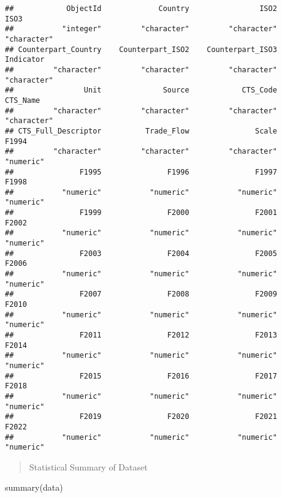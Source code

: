 \documentclass[
]{article}
\newenvironment{Shaded}{\begin{snugshade}}{\end{snugshade}}
\newcommand{\FunctionTok}[1]{\textcolor[rgb]{0.00,0.00,0.00}{#1}}
\newcommand{\NormalTok}[1]{#1}
\begin{document}
\begin{verbatim}
##            ObjectId             Country                ISO2                ISO3 
##           "integer"         "character"         "character"         "character" 
## Counterpart_Country    Counterpart_ISO2    Counterpart_ISO3           Indicator 
##         "character"         "character"         "character"         "character" 
##                Unit              Source            CTS_Code            CTS_Name 
##         "character"         "character"         "character"         "character" 
## CTS_Full_Descriptor          Trade_Flow               Scale               F1994 
##         "character"         "character"         "character"           "numeric" 
##               F1995               F1996               F1997               F1998 
##           "numeric"           "numeric"           "numeric"           "numeric" 
##               F1999               F2000               F2001               F2002 
##           "numeric"           "numeric"           "numeric"           "numeric" 
##               F2003               F2004               F2005               F2006 
##           "numeric"           "numeric"           "numeric"           "numeric" 
##               F2007               F2008               F2009               F2010 
##           "numeric"           "numeric"           "numeric"           "numeric" 
##               F2011               F2012               F2013               F2014 
##           "numeric"           "numeric"           "numeric"           "numeric" 
##               F2015               F2016               F2017               F2018 
##           "numeric"           "numeric"           "numeric"           "numeric" 
##               F2019               F2020               F2021               F2022 
##           "numeric"           "numeric"           "numeric"           "numeric"
\end{verbatim}

\begin{quote}
Statistical Summary of Dataset
\end{quote}

\begin{Shaded}
\begin{Highlighting}[]
\FunctionTok{summary}\NormalTok{(data)}
\end{Highlighting}
\end{Shaded}
\end{document}

